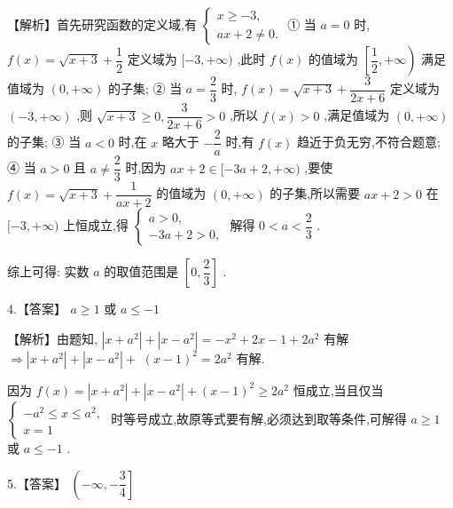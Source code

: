 \documentclass[10pt]{article}
\begin{document}
【解析】首先研究函数的定义域,有 $\left\{  \begin{array}{l} x \geq   - 3, \\  {ax} + 2 \neq  0. \end{array}\right.$ ① 当 $a = 0$ 时, $f\left( x\right)  = \sqrt{x + 3} + \dfrac{1}{2}$ 定义域为 $\lbrack  - 3, + \infty )$ ,此时 $f\left( x\right)$ 的值域为 $\left\lbrack  {\dfrac{1}{2}, + \infty }\right)$ 满足值域为 $\left( {0, + \infty }\right)$ 的子集; ② 当 $a = \dfrac{2}{3}$ 时, $f\left( x\right)  = \sqrt{x + 3} + \dfrac{3}{{2x} + 6}$ 定义域为 $\left( {-3, + \infty }\right)$ ,则 $\sqrt{x + 3} \geq  0,\dfrac{3}{{2x} + 6} > 0$ ,所以 $f\left( x\right)  > 0$ ,满足值域为 $\left( {0, + \infty }\right)$ 的子集; ③ 当 $a < 0$ 时,在 $x$ 略大于 $- \dfrac{2}{a}$ 时,有 $f\left( x\right)$ 趋近于负无穷,不符合题意; ④ 当 $a > 0$ 且 $a \neq  \dfrac{2}{3}$ 时,因为 ${ax} + 2 \in  \lbrack  - {3a} + 2, + \infty )$ ,要使 $f\left( x\right)  = \sqrt{x + 3} + \dfrac{1}{{ax} + 2}$ 的值域为 $\left( {0, + \infty }\right)$ 的子集,所以需要 ${ax} + 2 > 0$ 在 $\lbrack  - 3, + \infty )$ 上恒成立,得 $\left\{  \begin{array}{l} a > 0, \\   - {3a} + 2 > 0, \end{array}\right.$ 解得 $0 < a < \dfrac{2}{3}$ .

综上可得: 实数 $a$ 的取值范围是 $\left\lbrack  {0,\dfrac{2}{3}}\right\rbrack$ .

4.【答案】 $a \geq  1$ 或 $a \leq   - 1$

【解析】由题知, $\left| {x + {a}^{2}}\right|  + \left| {x - {a}^{2}}\right|  =  - {x}^{2} + {2x} - 1 + 2{a}^{2}$ 有解 $\Rightarrow  \left| {x + {a}^{2}}\right|  + \left| {x - {a}^{2}}\right|  +$  ${\left( x - 1\right) }^{2} = 2{a}^{2}$ 有解.

因为 $f\left( x\right)  = \left| {x + {a}^{2}}\right|  + \left| {x - {a}^{2}}\right|  + {\left( x - 1\right) }^{2} \geq  2{a}^{2}$ 恒成立,当且仅当 $\left\{  \begin{array}{l}  - {a}^{2} \leq  x \leq  {a}^{2}, \\  x = 1 \end{array}\right.$ 时等号成立,故原等式要有解,必须达到取等条件,可解得 $a \geq  1$ 或 $a \leq   - 1$ .

5.【答案】 $\left( {-\infty , - \dfrac{3}{4}}\right\rbrack$
\end{document}
